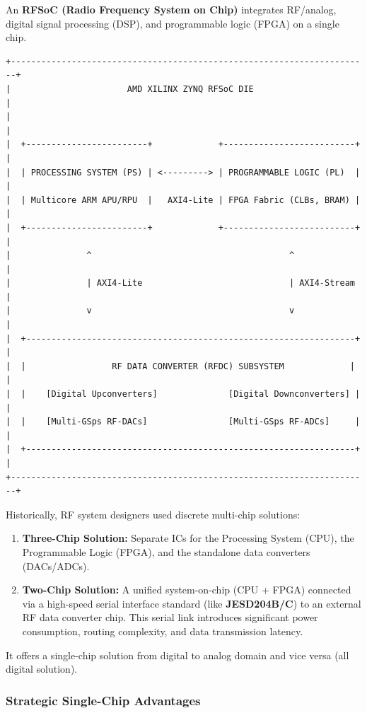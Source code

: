 \documentclass[
]{article}
\providecommand{\tightlist}{%
  \setlength{\itemsep}{0pt}\setlength{\parskip}{0pt}}
\begin{document}
An \textbf{RFSoC (Radio Frequency System on Chip)} integrates RF/analog,
digital signal processing (DSP), and programmable logic (FPGA) on a
single chip.

\begin{verbatim}
+-----------------------------------------------------------------------+
|                       AMD XILINX ZYNQ RFSoC DIE                       |
|                                                                       |
|  +------------------------+             +--------------------------+  |
|  | PROCESSING SYSTEM (PS) | <---------> | PROGRAMMABLE LOGIC (PL)  |  |
|  | Multicore ARM APU/RPU  |   AXI4-Lite | FPGA Fabric (CLBs, BRAM) |  |
|  +------------------------+             +--------------------------+  |
|               ^                                       ^               |
|               | AXI4-Lite                             | AXI4-Stream   |
|               v                                       v               |
|  +-----------------------------------------------------------------+  |
|  |                 RF DATA CONVERTER (RFDC) SUBSYSTEM             |  |
|  |    [Digital Upconverters]              [Digital Downconverters] |  |
|  |    [Multi-GSps RF-DACs]                [Multi-GSps RF-ADCs]     |  |
|  +-----------------------------------------------------------------+  |
+-----------------------------------------------------------------------+
\end{verbatim}

Historically, RF system designers used discrete multi-chip solutions:

\begin{enumerate}
\def\labelenumi{\arabic{enumi}.}
\tightlist
\item
  \textbf{Three-Chip Solution:} Separate ICs for the Processing System
  (CPU), the Programmable Logic (FPGA), and the standalone data
  converters (DACs/ADCs).
\item
  \textbf{Two-Chip Solution:} A unified system-on-chip (CPU + FPGA)
  connected via a high-speed serial interface standard (like
  \textbf{JESD204B/C}) to an external RF data converter chip. This
  serial link introduces significant power consumption, routing
  complexity, and data transmission latency.
\end{enumerate}

It offers a single-chip solution from digital to analog domain and vice
versa (all digital solution).

\subsubsection{Strategic Single-Chip
Advantages}\label{strategic-single-chip-advantages}
\end{document}
